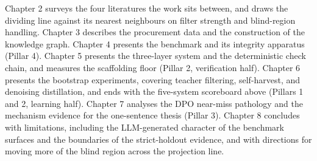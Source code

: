 Chapter 2 surveys the four literatures the work sits between, and draws the dividing line against its nearest neighbours on filter strength and blind-region handling. Chapter 3 describes the procurement data and the construction of the knowledge graph. Chapter 4 presents the benchmark and its integrity apparatus (Pillar 4). Chapter 5 presents the three-layer system and the deterministic check chain, and measures the scaffolding floor (Pillar 2, verification half). Chapter 6 presents the bootstrap experiments, covering teacher filtering, self-harvest, and denoising distillation, and ends with the five-system scoreboard above (Pillars 1 and 2, learning half). Chapter 7 analyses the DPO near-miss pathology and the mechanism evidence for the one-sentence thesis (Pillar 3). Chapter 8 concludes with limitations, including the LLM-generated character of the benchmark surfaces and the boundaries of the strict-holdout evidence, and with directions for moving more of the blind region across the projection line.
